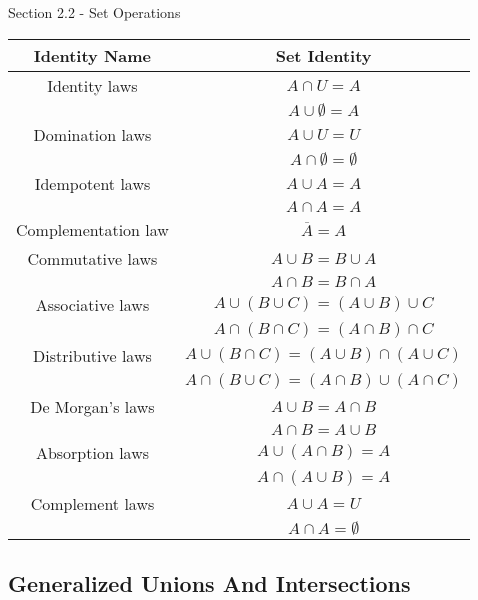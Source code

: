 \begin{notes}{Section 2.2 - Set Operations}
    \begin{center}
        \begin{tabular}{|c|c|}
            \hline \textbf{Identity Name} & \textbf{Set Identity} \\ \hline
            Identity laws & $A \cap U = A$ \\
                        & $A \cup \emptyset = A$ \\ \hline
            Domination laws & $A \cup U = U$ \\
                            & $A \cap \emptyset = \emptyset$ \\ \hline
            Idempotent laws & $A \cup A = A$ \\
                            & $A \cap A = A$ \\ \hline
            Complementation law & $\overline{A} = A$ \\ \hline
            Commutative laws & $A \cup B = B \cup A$ \\
                            & $A \cap B = B \cap A$ \\ \hline
            Associative laws & $A \cup (B \cup C) = (A \cup B) \cup C$ \\
                            & $A \cap (B \cap C) = (A \cap B) \cap C$ \\ \hline
            Distributive laws & $A \cup (B \cap C) = (A \cup B) \cap (A \cup C)$ \\
                            & $A \cap (B \cup C) = (A \cap B) \cup (A \cap C)$ \\ \hline
            De Morgan’s laws & $A \cup B = A \cap B$ \\
                            & $A \cap B = A \cup B$ \\ \hline
            Absorption laws & $A \cup (A \cap B) = A$ \\
                        & $A \cap (A \cup B) = A$ \\ \hline
            Complement laws & $A \cup A = U$ \\
                            & $A \cap A = \emptyset$ \\ \hline
        \end{tabular}
    \end{center}
        
    \subsection*{Generalized Unions And Intersections}


\end{notes}
